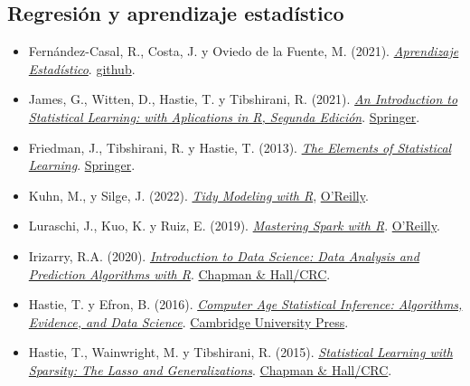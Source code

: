 \documentclass[
]{book}
\theoremstyle{break}
\theoremstyle{nonumberplain}
\begin{document}
\subsection*{Regresión y aprendizaje estadístico}\label{regresiuxf3n-y-aprendizaje-estaduxedstico}

\begin{itemize}
\item
  Fernández-Casal, R., Costa, J. y Oviedo de la Fuente, M. (2021). \emph{\href{https://rubenfcasal.github.io/aprendizaje_estadistico}{Aprendizaje Estadístico}}. \href{https://github.com/rubenfcasal/aprendizaje_estadistico}{github}.
\item
  James, G., Witten, D., Hastie, T. y Tibshirani, R. (2021). \emph{\href{https://www.statlearning.com}{An Introduction to Statistical Learning: with Aplications in R, Segunda Edición}}. \href{https://link.springer.com/book/10.1007/978-1-0716-1418-1}{Springer}.
\item
  Friedman, J., Tibshirani, R. y Hastie, T. (2013). \emph{\href{https://hastie.su.domains/ElemStatLearn/}{The Elements of Statistical Learning}}. \href{https://link.springer.com/book/10.1007/978-0-387-84858-7}{Springer}.
\item
  Kuhn, M., y Silge, J. (2022). \emph{\href{https://www.tmwr.org}{Tidy Modeling with R}}, \href{https://www.oreilly.com/library/view/tidy-modeling-with/9781492096474}{O'Reilly}.
\item
  Luraschi, J., Kuo, K. y Ruiz, E. (2019). \emph{\href{https://therinspark.com/}{Mastering Spark with R}}. \href{https://www.oreilly.com/library/view/mastering-spark-with/9781492046363/}{O'Reilly}.
\item
  Irizarry, R.A. (2020). \emph{\href{http://rafalab.dfci.harvard.edu/dsbook/}{Introduction to Data Science: Data Analysis and Prediction Algorithms with R}}. \href{https://www.routledge.com/p/book/9780367357986}{Chapman \& Hall/CRC}.
\item
  Hastie, T. y Efron, B. (2016). \emph{\href{https://hastie.su.domains/CASI/}{Computer Age Statistical Inference: Algorithms, Evidence, and Data Science}}. \href{http://www.amazon.com/dp/1107149894/}{Cambridge University Press}.
\item
  Hastie, T., Wainwright, M. y Tibshirani, R. (2015). \emph{\href{https://hastie.su.domains/StatLearnSparsity/}{Statistical Learning with Sparsity: The Lasso and Generalizations}}. \href{https://www.routledge.com/p/book/9781498712163}{Chapman \& Hall/CRC}.

\end{itemize}
\end{document}
